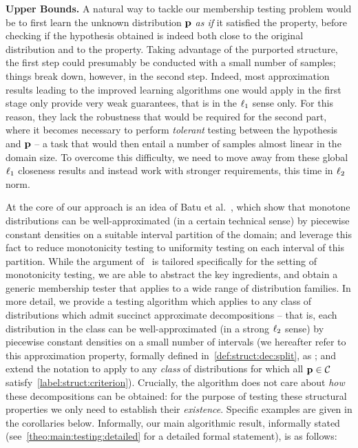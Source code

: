 \noindent \textbf{Upper Bounds.} A natural way to tackle our membership testing problem would be to first learn the unknown distribution $\D$ \emph{as if} it satisfied the property, before checking if the hypothesis obtained is indeed both close to the original distribution and to the property. Taking advantage of the purported structure, the first step could presumably be conducted with a small number of samples; things break down, however, in the second step. 
Indeed, most approximation results leading to the improved learning algorithms one would apply in the first stage only provide very weak guarantees, that is in the $\lp[1]$ sense only. For this reason, they lack the robustness that would be required for the second part, where it becomes necessary to perform \emph{tolerant} testing between the hypothesis and $\D$ -- a task that would then entail a number of samples almost linear in the domain size. To overcome this difficulty, we need to move away from these global $\lp[1]$ closeness results and instead work with stronger requirements, this time in $\lp[2]$ norm. 

At the core of our approach is an idea of Batu et al.~\cite{BKR:04}, which show that monotone distributions can be well-approximated (in a certain technical sense) 
by piecewise constant densities on a suitable interval partition of the domain; and leverage this fact to reduce monotonicity testing to uniformity testing on each interval of this partition. 
While the argument of~\cite{BKR:04} is tailored specifically for the setting of monotonicity testing, we are able to abstract the key ingredients, and obtain a generic membership tester that applies to a wide range of distribution families. In more detail, we provide a testing algorithm which applies to any class of distributions which admit succinct approximate decompositions -- that is, each distribution in the class can be well-approximated (in a strong $\lp[2]$ sense) by piecewise constant densities on a small number of intervals (we hereafter refer to this approximation property, formally defined in~\cref{def:struct:dec:split}, as ; and extend the notation to apply to any \emph{class} \class of distributions for which all $\D\in\class$ satisfy~\eqref{label:struct:criterion}). 
Crucially, the algorithm does not care about \emph{how} these decompositions can be obtained: 
for the purpose of testing these structural properties we only need to establish their \emph{existence}. Specific examples are given in the corollaries below.
Informally, our main algorithmic result, informally stated (see~\cref{theo:main:testing:detailed} for a detailed formal statement), is as follows:

